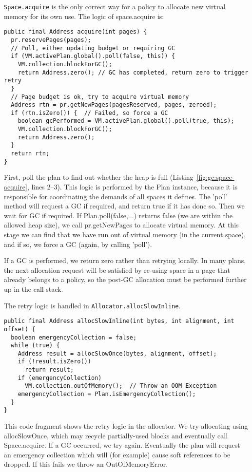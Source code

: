 \lstinline|Space.acquire| is the only correct way for a policy to allocate new
virtual memory for its own use.  The logic of space.acquire is:
\begin{lstlisting}[name=Space.java,caption=\lstname: acquiring new
pages.,label=fig:gc:space-acquire]
public final Address acquire(int pages) {
  pr.reservePages(pages);
  // Poll, either updating budget or requiring GC
  if (VM.activePlan.global().poll(false, this)) {
    VM.collection.blockForGC();
    return Address.zero(); // GC has completed, return zero to trigger retry
  }
  // Page budget is ok, try to acquire virtual memory
  Address rtn = pr.getNewPages(pagesReserved, pages, zeroed);
  if (rtn.isZero()) {  // Failed, so force a GC
    boolean gcPerformed = VM.activePlan.global().poll(true, this);
    VM.collection.blockForGC();
    return Address.zero();
  }
  return rtn;
}
\end{lstlisting}


First, poll the plan to find out whether the heap is full
(Listing~\ref{fig:gc:space-acquire}, lines 2--3).
This logic is performed by the Plan instance, because it is responsible for
coordinating the demands of all spaces it defines.
The 'poll' method will request a GC if required, and return true if it has done so.
Then we wait for GC if required.
If Plan.poll(false,...) returns false (we are within the allowed heap size), 
we call pr.getNewPages to allocate virtual memory.  
At this stage we can find that we have run out of virtual memory (in the
current space), and if so, we force a GC (again, by calling 'poll').

If a GC is performed, we return zero rather than retrying locally. 
In many plans, the next allocation request will be satisfied by re-using space 
in a page that already belongs to a policy, so the post-GC allocation 
must be performed further up in the call stack.  

The retry logic is handled in \lstinline|Allocator.allocSlowInline|.
\begin{lstlisting}[name=Allocator.java, 
                   caption=\lstname: allocSlowInline,
                   label=fig:gc:freelist-allocslow]
public final Address allocSlowInline(int bytes, int alignment, int offset) {
  boolean emergencyCollection = false;
  while (true) {
    Address result = allocSlowOnce(bytes, alignment, offset);
    if (!result.isZero())
      return result;
    if (emergencyCollection)
      VM.collection.outOfMemory();  // Throw an OOM Exception
    emergencyCollection = Plan.isEmergencyCollection();
  }
}
\end{lstlisting}
This code fragment shows the retry logic in the allocator.  We try allocating 
using allocSlowOnce, which may recycle partially-used blocks and eventually 
call Space.acquire.  If a GC occurred, we try again.  Eventually the plan 
will request an emergency collection which will (for example) cause 
soft references to be dropped.  If this fails we throw an OutOfMemoryError.

